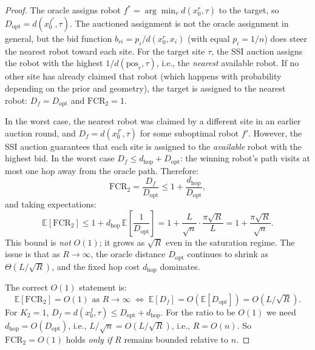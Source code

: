 \begin{proof}
The oracle assigns robot $f^* = \arg\min_r d(x_0^r, \tau)$ to the target,
so $D_{\mathrm{opt}} = d(x_0^{f^*}, \tau)$.
The auctioned assignment is not the oracle assignment in general, but the
bid function $b_{ri} = p_i/d(x_0^r, x_i)$ (with equal $p_i = 1/n$) does
steer the nearest robot toward each site.
For the target site $\tau$, the SSI auction assigns the robot with the
highest $1/d(\mathrm{pos}_r, \tau)$, i.e., the \emph{nearest} available
robot.
If no other site has already claimed that robot (which happens with
probability depending on the prior and geometry), the target is
assigned to the nearest robot: $D_f = D_{\mathrm{opt}}$ and
$\mathrm{FCR}_2 = 1$.

In the worst case, the nearest robot was claimed by a different site
in an earlier auction round, and $D_f = d(x_0^{f'}, \tau)$ for some
suboptimal robot $f'$.
However, the SSI auction guarantees that each site is assigned to the
\emph{available} robot with the highest bid.
In the worst case $D_f \leq d_{\mathrm{hop}} + D_{\mathrm{opt}}$:
the winning robot's path visits at most one hop away from the oracle
path.
Therefore:
\begin{equation}
  \mathrm{FCR}_2 = \frac{D_f}{D_{\mathrm{opt}}}
  \leq 1 + \frac{d_{\mathrm{hop}}}{D_{\mathrm{opt}}},
\end{equation}
and taking expectations:
\begin{equation}
  \mathbb{E}[\mathrm{FCR}_2]
  \leq 1 + d_{\mathrm{hop}}\,\mathbb{E}\!\left[\frac{1}{D_{\mathrm{opt}}}\right]
  = 1 + \frac{L}{\sqrt{n}}\cdot\frac{\pi\sqrt{R}}{L}
  = 1 + \frac{\pi\sqrt{R}}{\sqrt{n}}.
\end{equation}
This bound is \emph{not} $O(1)$; it grows as $\sqrt{R}$ even in the
saturation regime.
The issue is that as $R \to \infty$, the oracle distance $D_{\mathrm{opt}}$
continues to shrink as $\Theta(L/\sqrt{R})$, and the fixed hop cost
$d_{\mathrm{hop}}$ dominates.

The correct $O(1)$ statement is:
\begin{equation}\label{eq:fcr2-O1-correct}
  \mathbb{E}[\mathrm{FCR}_2]
  = O(1) \text{ as } R \to \infty
  \;\Longleftrightarrow\;
  \mathbb{E}[D_f] = O\!\left(\mathbb{E}[D_{\mathrm{opt}}]\right) = O(L/\sqrt{R}).
\end{equation}
For $K_2 = 1$, $D_f = d(x_0^f, \tau) \leq D_{\mathrm{opt}} + d_{\mathrm{hop}}$.
For the ratio to be $O(1)$ we need $d_{\mathrm{hop}} = O(D_{\mathrm{opt}})$,
i.e., $L/\sqrt{n} = O(L/\sqrt{R})$, i.e., $R = O(n)$.
So $\mathrm{FCR}_2 = O(1)$ holds \emph{only if} $R$ remains bounded relative to $n$.
\end{proof}

